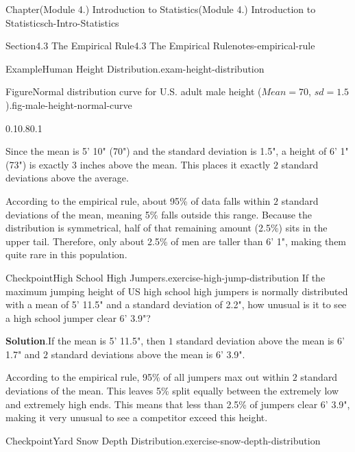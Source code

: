 \documentclass[oneside,10pt,]{book}
\newcommand{\blocktitlefont}{\relax}
\begin{document}
\begin{chapterptx}{Chapter}{(Module 4.) Introduction to Statistics}{}{(Module 4.) Introduction to Statistics}{}{}{ch-Intro-Statistics}
\begin{sectionptx}{Section}{4.3 The Empirical Rule}{}{4.3 The Empirical Rule}{}{}{notes-empirical-rule}
\begin{example}{Example}{Human Height Distribution.}{exam-height-distribution}
\begin{figureptx}{Figure}{Normal distribution curve for U.S. adult male height (\(Mean = 70\), \(sd = 1.5\)).}{fig-male-height-normal-curve}{}
\begin{image}{0.1}{0.8}{0.1}{}
{%
}%
\end{image}%
\tcblower
\end{figureptx}%
Since the mean is 5' 10" (70") and the standard deviation is 1.5", a height of 6' 1" (73") is exactly 3 inches above the mean. This places it exactly \(2\) standard deviations above the average.%
\par
According to the empirical rule, about 95\% of data falls within \(2\) standard deviations of the mean, meaning 5\% falls outside this range. Because the distribution is symmetrical, half of that remaining amount (2.5\%) sits in the upper tail. Therefore, only about 2.5\% of men are taller than 6' 1", making them quite rare in this population.%
\end{example}
\begin{inlineexercise}{Checkpoint}{High School High Jumpers.}{exercise-high-jump-distribution}%
If the maximum jumping height of US high school high jumpers is normally distributed with a mean of 5' 11.5" and a standard deviation of 2.2", how unusual is it to see a high school jumper clear 6' 3.9"?%
\par\smallskip%
\noindent\textbf{\blocktitlefont Solution}.\hypertarget{exercise-high-jump-distribution-3}{}\quad{}If the mean is 5' 11.5", then \(1\) standard deviation above the mean is 6' 1.7" and \(2\) standard deviations above the mean is 6' 3.9".%
\par
According to the empirical rule, 95\% of all jumpers max out within \(2\) standard deviations of the mean. This leaves 5\% split equally between the extremely low and extremely high ends. This means that less than 2.5\% of jumpers clear 6' 3.9", making it very unusual to see a competitor exceed this height.%
\end{inlineexercise}%
\begin{inlineexercise}{Checkpoint}{Yard Snow Depth Distribution.}{exercise-snow-depth-distribution}%

\end{inlineexercise}
\end{sectionptx}
\end{chapterptx}
\end{document}
